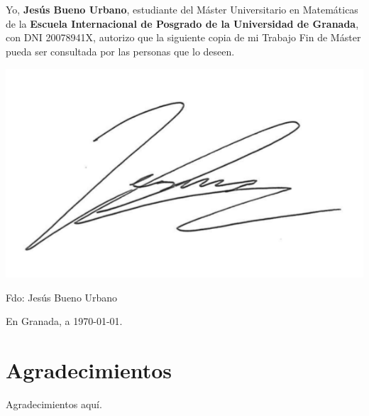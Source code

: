 


\chapter*{}
\thispagestyle{empty}

\noindent{\rule[-1ex]{\textwidth}{2pt}\\[4.5ex]}
Yo, \textbf{Jesús Bueno Urbano}, estudiante del Máster Universitario en Matemáticas de la \textbf{Escuela Internacional de Posgrado de la Universidad de Granada}, con DNI 20078941X, autorizo que la siguiente copia de mi Trabajo Fin de Máster pueda ser consultada por las personas que lo deseen.

\vspace{2cm}

\includegraphics[scale=0.3]{images/firma.png}

\vspace{1cm}

\noindent Fdo: Jesús Bueno Urbano

\vspace{2cm}

\begin{flushright}
En Granada, a \today.
\end{flushright}


\chapter*{Agradecimientos}
\thispagestyle{empty}
\vspace{1cm}

Agradecimientos aquí.